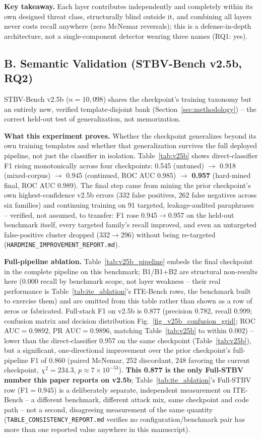 \documentclass[conference]{IEEEtran}
\begin{document}
\textbf{Key takeaway.} Each layer contributes independently and completely within its own designed threat class, structurally blind outside it, and combining all layers never costs recall anywhere (zero McNemar reversals); this is a defense-in-depth architecture, not a single-component detector wearing three names (RQ1: yes).

\subsection{B. Semantic Validation (STBV-Bench v2.5b, RQ2)}
\label{sec:v25b}
STBV-Bench v2.5b ($n{=}10{,}098$) shares the checkpoint's training taxonomy but an entirely new, verified template-disjoint bank (Section~\ref{sec:methodology}) -- the correct held-out test of generalization, not memorization.

\textbf{What this experiment proves.} Whether the checkpoint generalizes beyond its own training templates and whether that generalization survives the full deployed pipeline, not just the classifier in isolation. Table~\ref{tab:v25b} shows direct-classifier F1 rising monotonically across four checkpoints: 0.545 (untuned) $\to$ 0.918 (mixed-corpus) $\to$ 0.945 (continued, ROC AUC 0.985) $\to$ \textbf{0.957} (hard-mined final, ROC AUC 0.989). The final step came from mining the prior checkpoint's own highest-confidence v2.5b errors (332 false positives, 262 false negatives across six families) and continuing training on 91 targeted, leakage-audited paraphrases -- verified, not assumed, to transfer: F1 rose 0.945$\to$0.957 on the held-out benchmark itself, every targeted family's recall improved, and even an untargeted false-positive cluster dropped (332$\to$296) without being re-targeted (\texttt{HARDMINE\_IMPROVEMENT\_REPORT.md}).

\textbf{Full-pipeline ablation.} Table~\ref{tab:v25b_pipeline} embeds the final checkpoint in the complete pipeline on this benchmark; B1/B1+B2 are structural non-results here (0.000 recall by benchmark scope, not layer weakness -- their real performance is Table~\ref{tab:ite_ablation}'s ITE-Bench rows, the benchmark built to exercise them) and are omitted from this table rather than shown as a row of zeros or fabricated. Full-stack F1 on v2.5b is $\mathbf{0.877}$ (precision 0.782, recall 0.999; confusion matrix and decision distribution Fig.~\ref{fig_v25b_confusion_grid}; ROC AUC$=0.9892$, PR AUC$=0.9896$, matching Table~\ref{tab:v25b} to within $0.002$) -- lower than the direct-classifier 0.957 on the same checkpoint (Table~\ref{tab:v25b}), but a significant, one-directional improvement over the prior checkpoint's full-pipeline F1 of 0.860 (paired McNemar, 252 discordant, 248 favoring the current checkpoint, $\chi^2{=}234.3$, $p{\approx}7{\times}10^{-53}$). \textbf{This 0.877 is the only Full-STBV number this paper reports on v2.5b}; Table~\ref{tab:ite_ablation}'s Full-STBV row (F1$=0.945$) is a deliberately separate, independent measurement on ITE-Bench -- a different benchmark, different attack mix, same checkpoint and code path -- not a second, disagreeing measurement of the same quantity (\texttt{TABLE\_CONSISTENCY\_REPORT.md} verifies no configuration/benchmark pair has more than one reported value anywhere in this manuscript).
\end{document}
